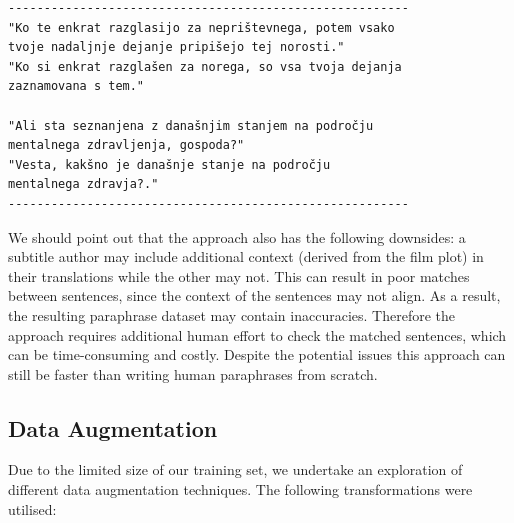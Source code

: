 \documentclass[fleqn,moreauthors,10pt]{ds_report}
\begin{document}
\begin{scriptsize}
\begin{verbatim}
--------------------------------------------------------
"Ko te enkrat razglasijo za neprištevnega, potem vsako 
tvoje nadaljnje dejanje pripišejo tej norosti."  
"Ko si enkrat razglašen za norega, so vsa tvoja dejanja
zaznamovana s tem."

"Ali sta seznanjena z današnjim stanjem na področju 
mentalnega zdravljenja, gospoda?"
"Vesta, kakšno je današnje stanje na področju 
mentalnega zdravja?."
--------------------------------------------------------
\end{verbatim}
\end{scriptsize}

We should point out that the approach also has the following downsides: a subtitle author may include additional context (derived from the film plot) in their translations while the other may not. This can result in poor matches between sentences, since the context of the sentences may not align. As a result, the resulting paraphrase dataset may contain inaccuracies. Therefore the approach requires additional human effort to check the matched sentences, which can be time-consuming and costly. Despite the potential issues this approach can still be faster than writing human paraphrases from scratch.




 

\subsection{Data Augmentation}

Due to the limited size of our training set, we undertake an exploration of different data augmentation techniques. The following transformations were utilised:
\end{document}
